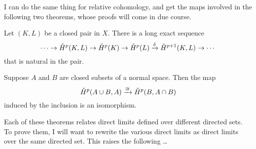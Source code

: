 I can do the same thing for relative cohomology, and get the maps
involved in the following two theorems, whose proofs will come in due course.
\begin{theorem}
\label{cech-les}
Let $(K,L)$ be a closed pair in $X$. There is a long exact sequence
\begin{equation*}
\cdots\to\check{H}^p(K,L)\to\check{H}^p(K)\to\check{H}^p(L)\xrightarrow{\delta}\check{H}^{p+1}(K,L)\to\cdots
\end{equation*}
that is natural in the pair. 
\end{theorem}
\begin{theorem}[Excision]
\label{cech-excision}
Suppose $A$ and $B$ are closed subsets of a normal space.  
Then the map
\[
\check{H}^p(A\cup B,A)\xrightarrow{\cong}\check{H}^p(B,A\cap B)
\] 
induced by the inclusion is an isomorphism.
\end{theorem}

Each of these theorems relates direct limits defined over different directed 
sets. To prove them, I will want to rewrite the various direct limits
as direct limits over the same directed set. This raises the following \ldots

